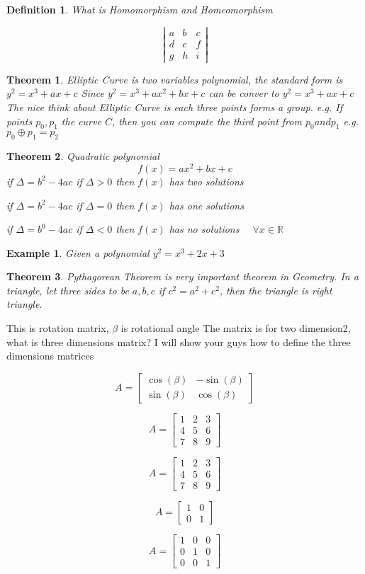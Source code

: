 \documentclass{article}
\newtheorem{theorem}{Theorem}
\newtheorem{defintion}{Definition}
\newtheorem{example}{Example}
\begin{document}
\begin{defintion}
What is Homomorphism and Homeomorphism
\end{defintion}

\[
    \left| \begin{array}{ccc}
    a & b & c \\
    d & e & f \\
    g & h & i \end{array} \right|
\] 

\begin{theorem}
Elliptic Curve is two variables polynomial, the standard form is $y^2 = x^3 + ax + c$ 
Since $y^2 = x^3 + ax^2 + bx + c$ can be conver to $y^2 = x^3 + ax + c$
The nice think about Elliptic Curve is each three points forms a group.
e.g. If points $p_0, p_1$ the curve $C$, then you can compute the third point
from $p_0 and p_1$
e.g. $p_0 \oplus p_1 = p_2$
\end{theorem} 

\begin{theorem}
Quadratic polynomial \[ f(x) = ax^2 + bx + c  \]
if $\Delta = b^2 - 4ac$ if $\Delta > 0$ 
then $f(x)$ has two solutions

if $\Delta = b^2 - 4ac$ if $\Delta = 0$
then $f(x)$ has one solutions

if $\Delta = b^0 - 4ac$ if $\Delta < 0$
then $f(x)$ has no solutions $\quad \forall x \in \mathbb{R}$
\end{theorem} 

\begin{example}
Given a polynomial $y^2 = x^3 + 2x + 3$
\end{example} 


\begin{theorem}
Pythagorean Theorem is very important theorem in Geometry.
In a triangle, let three sides to be $a, b, c$ 
if $c^2 = a^2 + c^2$, then the triangle is right triangle.
\end{theorem} 

This is rotation matrix, $\beta$ is rotational angle
The matrix is for two dimension2, what is three dimensions matrix?
I will show your guys how to define the three dimensions matrices

\[ 
    A= \begin{bmatrix}
    \cos(\beta) & -\sin(\beta)\\
    \sin(\beta) & \cos(\beta)
    \end{bmatrix} 
\]


\[ 
    A= \begin{bmatrix}
    1 & 2 & 3\\
    4 & 5 & 6\\
    7 & 8 & 9
    \end{bmatrix} 
\]

\[ A= \begin{bmatrix}
1 & 2 & 3\\
4 & 5 & 6\\
7 & 8 & 9
\end{bmatrix} 
 \]

\[ A= \begin{bmatrix}
1 & 0\\
0 & 1
\end{bmatrix} 
 \]

\[ 
    A= \begin{bmatrix}
    1 & 0 & 0\\
    0 & 1 & 0\\
    0 & 0 & 1
    \end{bmatrix} 
 \]
\end{document}
